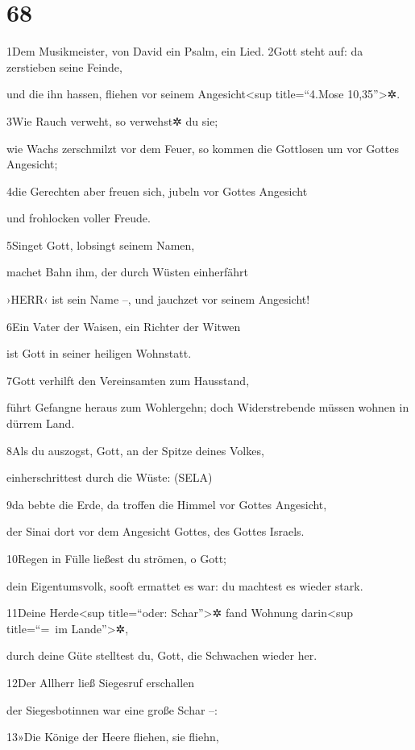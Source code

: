 \hypertarget{section-67}{%
\section{68}\label{section-67}}

1Dem Musikmeister, von David ein Psalm, ein Lied. 2Gott steht auf: da
zerstieben seine Feinde,

und die ihn hassen, fliehen vor seinem Angesicht\textless sup
title=``4.Mose 10,35''\textgreater✲.

3Wie Rauch verweht, so verwehst✲ du sie;

wie Wachs zerschmilzt vor dem Feuer, so kommen die Gottlosen um vor
Gottes Angesicht;

4die Gerechten aber freuen sich, jubeln vor Gottes Angesicht

und frohlocken voller Freude.

5Singet Gott, lobsingt seinem Namen,

machet Bahn ihm, der durch Wüsten einherfährt

›HERR‹ ist sein Name --, und jauchzet vor seinem Angesicht!

6Ein Vater der Waisen, ein Richter der Witwen

ist Gott in seiner heiligen Wohnstatt.

7Gott verhilft den Vereinsamten zum Hausstand,

führt Gefangne heraus zum Wohlergehn; doch Widerstrebende müssen wohnen
in dürrem Land.

8Als du auszogst, Gott, an der Spitze deines Volkes,

einherschrittest durch die Wüste: (SELA)

9da bebte die Erde, da troffen die Himmel vor Gottes Angesicht,

der Sinai dort vor dem Angesicht Gottes, des Gottes Israels.

10Regen in Fülle ließest du strömen, o Gott;

dein Eigentumsvolk, sooft ermattet es war: du machtest es wieder stark.

11Deine Herde\textless sup title=``oder: Schar''\textgreater✲ fand
Wohnung darin\textless sup title=``=~im Lande''\textgreater✲,

durch deine Güte stelltest du, Gott, die Schwachen wieder her.

12Der Allherr ließ Siegesruf erschallen

der Siegesbotinnen war eine große Schar --:

13»Die Könige der Heere fliehen, sie fliehn,

